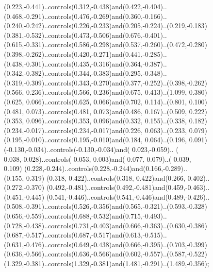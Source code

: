 \begin{Project}
\begin{figure}[H]
\begin{floatrow}
{{\begin{scope}[#2,rotate=#1]
                    (0.223,-0.441)..controls(0.312,-0.438)and(0.422,-0.404)..
                    (0.468,-0.291)..controls(0.476,-0.269)and(0.360,-0.166)..
                    (0.240,-0.242)..controls(0.226,-0.233)and(0.205,-0.224)..(0.219,-0.183)
                    (0.381,-0.532)..controls(0.473,-0.506)and(0.676,-0.401)..
                    (0.615,-0.331)..controls(0.586,-0.298)and(0.537,-0.260)..(0.472,-0.280)
                    (0.398,-0.262)..controls(0.420,-0.271)and(0.441,-0.285)..
                    (0.438,-0.301)..controls(0.435,-0.316)and(0.364,-0.387)..
                    (0.342,-0.382)..controls(0.344,-0.383)and(0.295,-0.348)..
                    (0.319,-0.309)..controls(0.343,-0.270)and(0.377,-0.252)..(0.398,-0.262)
                    (0.566,-0.236)..controls(0.566,-0.236)and(0.675,-0.413)..(1.099,-0.380)
                    (0.625, 0.066)..controls(0.625, 0.066)and(0.702, 0.114)..(0.801, 0.100)
                    (0.481, 0.073)..controls(0.481, 0.073)and(0.486, 0.167)..(0.509, 0.222)
                    (0.353, 0.096)..controls(0.353, 0.096)and(0.332, 0.155)..(0.338, 0.182)
                    (0.234,-0.017)..controls(0.234,-0.017)and(0.226, 0.063)..(0.233, 0.079)
                    (0.195,-0.010)..controls(0.195,-0.010)and(0.184, 0.064)..(0.196, 0.091)
                    (-0.130,-0.034)..controls(-0.130,-0.034)and( 0.023,-0.059)..
                    ( 0.038,-0.028)..controls( 0.053, 0.003)and( 0.077, 0.079)..( 0.039, 0.109)
                    (0.228,-0.244)..controls(0.228,-0.244)and(0.166,-0.289)..(0.155,-0.319)
                    (0.318,-0.422)..controls(0.318,-0.422)and(0.266,-0.402)..(0.272,-0.370)
                    (0.492,-0.481)..controls(0.492,-0.481)and(0.459,-0.463)..(0.451,-0.445)
                    (0.541,-0.446)..controls(0.541,-0.446)and(0.489,-0.426)..
                    (0.508,-0.391)..controls(0.526,-0.356)and(0.565,-0.321)..(0.593,-0.328)
                    (0.656,-0.559)..controls(0.688,-0.532)and(0.715,-0.493)..
                    (0.728,-0.438)..controls(0.731,-0.403)and(0.666,-0.363)..(0.630,-0.386)
                    (0.687,-0.517)..controls(0.687,-0.517)and(0.613,-0.515)..
                    (0.631,-0.476)..controls(0.649,-0.438)and(0.666,-0.395)..(0.703,-0.399)
                    (0.636,-0.566)..controls(0.636,-0.566)and(0.602,-0.557)..(0.587,-0.522)
                    (1.329,-0.381)..controls(1.329,-0.381)and(1.481,-0.291)..(1.489,-0.356);
                \end{scope}
            }
            }
\end{floatrow}
\end{figure}
\end{Project}
